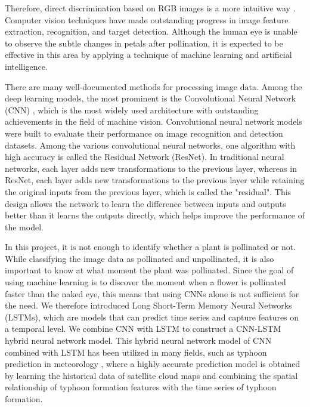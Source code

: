 \documentclass[11pt,a4paper]{article}
\begin{document}
\begin{spacing}{1.5}
Therefore, direct discrimination based on RGB images is a more intuitive way \citep{gutub2010pixel}. Computer vision techniques have made outstanding progress in image feature extraction, recognition, and target detection. Although the human eye is unable to observe the subtle changes in petals after pollination, it is expected to be effective in this area by applying a technique of machine learning and artificial intelligence.

There are many well-documented methods for processing image data. Among the deep learning models, the most prominent is the Convolutional Neural Network (CNN) \citep{albawi2017understanding}, which is the most widely used architecture with outstanding achievements in the field of machine vision. Convolutional neural network models were built to evaluate their performance on image recognition and detection datasets.\citep{o2015introduction} Among the various convolutional neural networks, one algorithm with high accuracy is called the Residual Network (ResNet). In traditional neural networks, each layer adds new transformations to the previous layer, whereas in ResNet, each layer adds new transformations to the previous layer while retaining the original inputs from the previous layer, which is called the "residual". This design allows the network to learn the difference between inputs and outputs better than it learns the outputs directly, which helps improve the performance of the model.

In this project, it is not enough to identify whether a plant is pollinated or not. While classifying the image data as pollinated and unpollinated, it is also important to know at what moment the plant was pollinated. Since the goal of using machine learning is to discover the moment when a flower is pollinated faster than the naked eye, this means that using CNNs alone is not sufficient for the need. We therefore introduced Long Short-Term Memory Neural Networks (LSTMs)\citep{yu2019review}, which are models that can predict time series and capture features on a temporal level. We combine CNN with LSTM to construct a CNN-LSTM hybrid neural network model.\citep{garcia2020comparison} This hybrid neural network model of CNN combined with LSTM has been utilized in many fields, such as typhoon prediction in meteorology \citep{article}, where a highly accurate prediction model is obtained by learning the historical data of satellite cloud maps and combining the spatial relationship of typhoon formation features with the time series of typhoon formation.


\end{spacing}
\end{document}
